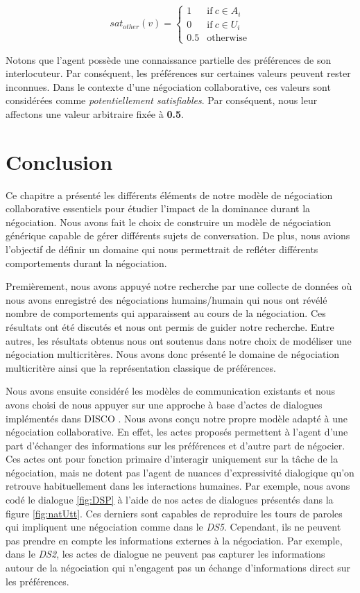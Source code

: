 \begin{equation}
sat_{other}(v)= \left\{\begin{array}{ll}
1	 & \mathrm{if\ }  c \in A_i\\
0    & \mathrm{if\ }c \in U_i\\
0.5	 & \mathrm{otherwise}
\end{array}\right.
\end{equation}

Notons que l'agent possède une connaissance partielle des préférences de son interlocuteur. Par conséquent, les préférences sur certaines valeurs peuvent rester inconnues. Dans  le contexte d'une négociation collaborative, ces valeurs sont considérées comme \textit{potentiellement satisfiables}. Par conséquent, nous leur affectons une valeur arbitraire fixée à \textbf{0.5}.

\section{Conclusion}
Ce chapitre a présenté les différents éléments de notre modèle de négociation collaborative essentiels pour étudier l'impact de la dominance durant la négociation. Nous avons fait le choix de construire un modèle de négociation générique capable de gérer différents sujets de conversation. De plus, nous avions l'objectif de définir un domaine qui nous permettrait de refléter différents comportements durant la négociation. 

Premièrement, nous avons appuyé notre recherche par une collecte de données où nous avons enregistré des négociations humains/humain qui nous ont révélé nombre de comportements qui apparaissent au cours de la négociation. Ces résultats ont été discutés et nous ont permis de guider notre recherche. Entre autres, les résultats obtenus nous ont soutenus dans notre choix de modéliser une négociation  multicritères.
Nous avons donc présenté le domaine de négociation multicritère ainsi que la représentation classique de préférences.

Nous avons ensuite considéré les modèles de communication existants et nous avons choisi de nous appuyer sur une approche à base d'actes de dialogues implémentés dans DISCO \cite{rich09}. Nous avons conçu notre propre modèle adapté à une négociation collaborative. En effet, les actes proposés permettent à l'agent d'une part d'échanger des informations sur les préférences et d'autre part de négocier. Ces actes ont pour fonction primaire d'interagir uniquement sur la tâche de la négociation, mais ne dotent pas l'agent de nuances d'expressivité dialogique qu'on retrouve habituellement dans les interactions humaines.
Par exemple, nous avons codé le dialogue \ref{fig:DSP} à l'aide de nos actes de dialogues présentés dans la figure \ref{fig:natUtt}. Ces derniers sont capables de reproduire les tours de paroles qui impliquent une négociation comme dans le \emph{DS5}. Cependant, ils ne peuvent pas prendre en compte les informations externes à la négociation. Par exemple, dans le \emph{DS2}, les actes de dialogue ne peuvent pas capturer les informations autour de la négociation qui n'engagent pas un échange d'informations direct sur les préférences.

